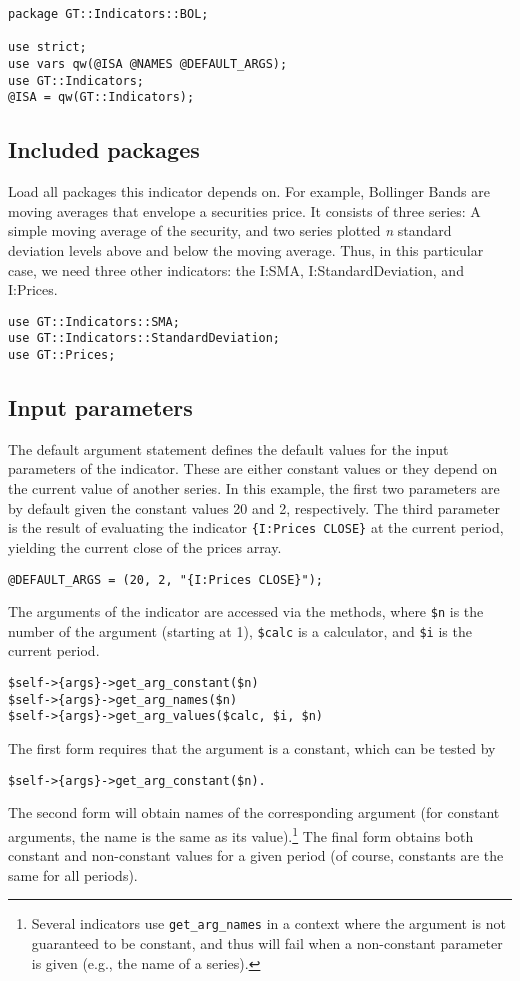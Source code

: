 \documentclass[11pt,twoside]{article}
\begin{document}
\begin{lstlisting}[name=example]
package GT::Indicators::BOL;

use strict;
use vars qw(@ISA @NAMES @DEFAULT_ARGS);
use GT::Indicators;
@ISA = qw(GT::Indicators);
\end{lstlisting}

\subsection{Included packages}
Load all packages this indicator depends on. For example, Bollinger
Bands are moving averages that envelope a securities price. It consists
of three series: A simple moving average of the security, and two
series plotted \textit{n} standard deviation levels above and below the
moving average. Thus, in this particular case, we need three other
indicators: the I:SMA, I:StandardDeviation, and I:Prices.

\begin{lstlisting}[name=example]
use GT::Indicators::SMA;
use GT::Indicators::StandardDeviation;
use GT::Prices;
\end{lstlisting}

\subsection{Input parameters}
The default argument statement defines the default values for the input
parameters of the indicator. These are either constant values or they
depend on the current value of another series. In this example, the
first two parameters are by default given the constant values 20 and 2,
respectively. The third parameter is the result of evaluating the
indicator \lstinline!{I:Prices CLOSE}! at the current period,
yielding the current close of the prices array. 
\begin{lstlisting}[name=example]
@DEFAULT_ARGS = (20, 2, "{I:Prices CLOSE}");
\end{lstlisting}
The arguments of the indicator are accessed via the methods, where
\lstinline!$n! is the number of the argument (starting at 1),
\lstinline!$calc! is a calculator, and \lstinline!$i!
is the current period.
\begin{lstlisting}[numbers=none]
$self->{args}->get_arg_constant($n)
$self->{args}->get_arg_names($n)
$self->{args}->get_arg_values($calc, $i, $n)
\end{lstlisting}

The first form requires that the argument is a constant, which can be
tested by
\begin{lstlisting}[numbers=none]
$self->{args}->get_arg_constant($n).
\end{lstlisting}
The second form will obtain names of the corresponding argument (for
constant arguments, the name is the same as its
value).\footnote{Several indicators use
\lstinline!get_arg_names! in a context where the argument is
not guaranteed to be constant, and thus will fail when a non-constant
parameter is given (e.g., the name of a series).} The final form
obtains both constant and non-constant values for a given period (of
course, constants are the same for all periods).
\end{document}
